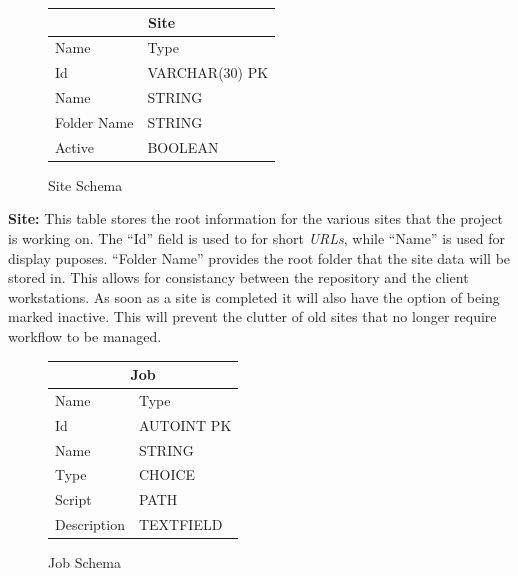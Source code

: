\documentclass[12pt,a4paper]{report}
\begin{document}
\begin{figure}
\begin{tabular}{l|l}
    \multicolumn{2}{c}{Site} \\
    \hline
    Name        & Type \\
    \hline
    Id          & VARCHAR(30) PK \\
    Name        & STRING \\
    Folder Name & STRING \\
    Active      & BOOLEAN \\
\end{tabular}
\caption{Site Schema}
\end{figure}
\noindent\textbf{Site:}
This table stores the root information for the various sites that
the project is working on. The ``Id'' field is used to for short
\emph{URLs}, while ``Name'' is used for display puposes. ``Folder Name''
provides the root folder that the site data will be stored in. This
allows for consistancy between the repository and the client workstations.
As soon as a site is completed it will also have the option of being marked
inactive. This will prevent the clutter of old sites that no longer require
workflow to be managed.
\\
\begin{figure}
\begin{tabular}{l|l}
    \multicolumn{2}{c}{Job} \\
    \hline
    Name        & Type \\
    \hline
    Id          & AUTOINT PK \\
    Name        & STRING \\
    Type        & CHOICE \\
    Script      & PATH \\
    Description & TEXTFIELD \\
\end{tabular}
\caption{Job Schema}
\end{figure}
\end{document}

